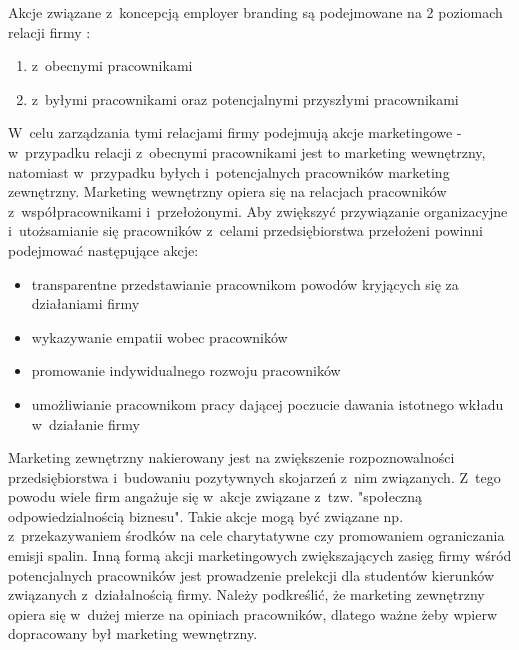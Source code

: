Akcje związane z~koncepcją employer branding są podejmowane na 2 poziomach relacji firmy \cite{spychala-2019}:
\begin{enumerate}
    \item z~obecnymi pracownikami
    \item z~byłymi pracownikami oraz potencjalnymi przyszłymi pracownikami
\end{enumerate}

W~celu zarządzania tymi relacjami firmy podejmują akcje marketingowe - w~przypadku relacji z~obecnymi pracownikami jest to marketing wewnętrzny,
natomiast w~przypadku byłych i~potencjalnych pracowników marketing zewnętrzny.
Marketing wewnętrzny opiera się na relacjach pracowników z~współpracownikami i~przełożonymi.
Aby zwiększyć przywiązanie organizacyjne i~utożsamianie się pracowników z~celami przedsiębiorstwa przełożeni powinni podejmować następujące akcje:
\begin{itemize}
    \item transparentne przedstawianie pracownikom powodów kryjących się za działaniami firmy
    \item wykazywanie empatii wobec pracowników
    \item promowanie indywidualnego rozwoju pracowników
    \item umożliwianie pracownikom pracy dającej poczucie dawania istotnego wkładu w~działanie firmy
\end{itemize}

Marketing zewnętrzny nakierowany jest na zwiększenie rozpoznowalności przedsiębiorstwa i~budowaniu pozytywnych skojarzeń z~nim związanych.
Z~tego powodu wiele firm angażuje się w~akcje związane z~tzw. "społeczną odpowiedzialnością biznesu".
Takie akcje mogą być związane np. z~przekazywaniem środków na cele charytatywne czy promowaniem ograniczania emisji spalin.
Inną formą akcji marketingowych zwiększających zasięg firmy wśród potencjalnych pracowników jest prowadzenie prelekcji dla studentów kierunków związanych z~działalnością firmy.
Należy podkreślić, że marketing zewnętrzny opiera się w~dużej mierze na opiniach pracowników, dlatego ważne żeby wpierw dopracowany był marketing wewnętrzny.

